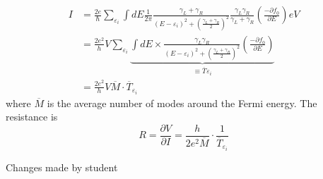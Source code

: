 \begin{align}
    I& = \frac{2e}{\hbar}\sum_{\varepsilon_{i}}{\int dE \frac{1}{2\pi}\frac{\gamma_{L}+\gamma_{R}}{\left(E-\varepsilon_{i}\right)^{2}+\left(\frac{\gamma_{L}+\gamma_{R}}{2}\right)^{2}} \frac{\gamma_{L}\gamma_{R}}{\gamma_{L}+\gamma_{R}} \left(\frac{-\partial f_{0}}{\partial E}\right)eV}\nonumber\\
    &= \frac{2e^2}{h}V\sum_{\varepsilon_{i}}{\underbrace{\int dE\times \frac{\gamma_{L}\gamma_{R}}{\left(E-\varepsilon_{i}\right)^{2}+\left(\frac{\gamma_{L}+\gamma_{R}}{2}\right)^{2}} \left(\frac{-\partial f_{0}}{\partial E}\right)}_{\equiv \overline{T}_{}\varepsilon_{i}}}\nonumber\\
    &= \frac{2e^{2}}{h}V\overline{M}\cdot\overline{T}_{\varepsilon_{i}}
\end{align} where $\overline{M}$ is the average number of modes around the Fermi energy. The resistance is \begin{equation}
    R = \frac{\partial V}{\partial I} = \frac{h}{2e^{2}\overline{M}}\cdot\frac{1}{\overline{T}_{\varepsilon_{i}}}
\end{equation} 

Changes made by student
